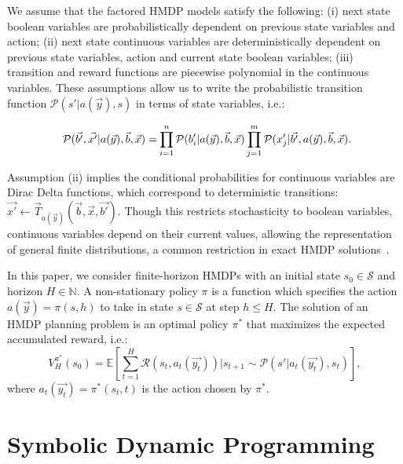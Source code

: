 \documentclass[letterpaper]{article}
\begin{document}
We assume that the factored HMDP models satisfy the following: (i) next state boolean variables are probabilistically dependent on previous state variables and action; (ii) next state continuous variables are deterministically dependent on previous state variables, action and current state boolean variables; (iii) transition and reward functions are piecewise polynomial in the continuous variables. 
These assumptions allow us to write the probabilistic transition function $\mathcal{P}(s' | a(\vec{y}),s)$ in terms of state variables, i.e.:

{\small
\begin{equation*}
\hspace{-0.6mm} \mathcal{P}(\vec{b'},\vec{x'} | a(\vec{y}),\vec{b},\vec{x}) =\hspace{-0.2mm} \prod_{i=1}^{n} \mathcal{P}(b_i' | a(\vec{y}),\vec{b},\vec{x}) \prod_{j=1}^{m} \mathcal{P}(x_j' | \vec{b'}, a(\vec{y}),\vec{b},\vec{x}).\hspace{-2mm}
\end{equation*}
}

Assumption (ii) implies the conditional probabilities for continuous variables are Dirac Delta functions, which correspond to deterministic transitions: $\vec{x'} \gets \vec{T}_{a(\vec{y})}(\vec{b},\vec{x},\vec{b'})$. 
Though this restricts stochasticity to boolean variables, continuous variables depend on their current values, allowing the representation of general finite distributions, a common restriction in exact HMDP solutions~\cite{feng04,meuleau09HAO,zamani12}.

In this paper, we consider finite-horizon HMDPs with an initial state $s_0 \in \mathcal{S}$ and horizon $H \in \mathbb{N}$.
A non-stationary policy $\pi$ is a function which specifies the action $a(\vec{y}) = \pi(s, h)$ to take in state $s \in \mathcal{S}$ at step $h \leq H$.
The solution of an HMDP planning problem is an optimal policy $\pi^*$ that maximizes the expected accumulated reward, i.e.:%
{\small
\begin{equation*}
V_{H}^{\pi^*}(s_0)= \mathbb{E} \left[ \sum_{t=1}^{H} \mathcal{R}(s_t, a_t(\vec{y_t})) \Big| s_{t+1} \sim \mathcal{P}(s'|a_t(\vec{y_t}),s_{t}) \right], %
\end{equation*}
}
where $a_t(\vec{y_t}) = \pi^*(s_t,t)$ is the action chosen by $\pi^*$.

\section{Symbolic Dynamic Programming}
\end{document}
